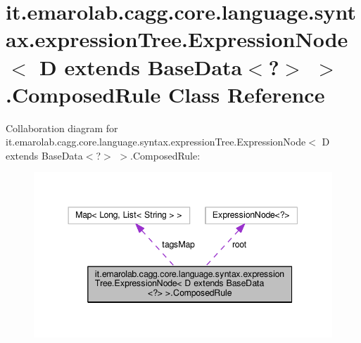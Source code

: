 \hypertarget{classit_1_1emarolab_1_1cagg_1_1core_1_1language_1_1syntax_1_1expressionTree_1_1ExpressionNode_3_85122d0a00e50139778c858e32d721ce}{\section{it.\-emarolab.\-cagg.\-core.\-language.\-syntax.\-expression\-Tree.\-Expression\-Node$<$ D extends Base\-Data$<$?$>$ $>$.Composed\-Rule Class Reference}
\label{classit_1_1emarolab_1_1cagg_1_1core_1_1language_1_1syntax_1_1expressionTree_1_1ExpressionNode_3_85122d0a00e50139778c858e32d721ce}
}


Collaboration diagram for it.\-emarolab.\-cagg.\-core.\-language.\-syntax.\-expression\-Tree.\-Expression\-Node$<$ D extends Base\-Data$<$?$>$ $>$.Composed\-Rule\-:\nopagebreak
\begin{figure}[H]
\begin{center}
\leavevmode
\includegraphics[width=344pt]{classit_1_1emarolab_1_1cagg_1_1core_1_1language_1_1syntax_1_1expressionTree_1_1ExpressionNode_3_76868aeca4fbd2933aabc9719daa1441}
\end{center}
\end{figure}
